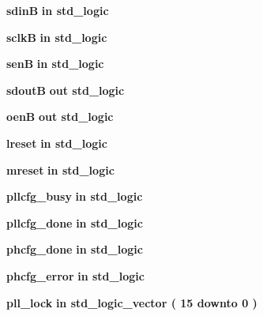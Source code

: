 \begin{DoxyCompactItemize}
{\bf sdinB}  {\bfseries {\bfseries \textcolor{keywordflow}{in}\textcolor{vhdlchar}{ }}} {\bfseries \textcolor{comment}{std\+\_\+logic}\textcolor{vhdlchar}{ }} 
\item 
{\bf sclkB}  {\bfseries {\bfseries \textcolor{keywordflow}{in}\textcolor{vhdlchar}{ }}} {\bfseries \textcolor{comment}{std\+\_\+logic}\textcolor{vhdlchar}{ }} 
\item 
{\bf senB}  {\bfseries {\bfseries \textcolor{keywordflow}{in}\textcolor{vhdlchar}{ }}} {\bfseries \textcolor{comment}{std\+\_\+logic}\textcolor{vhdlchar}{ }} 
\item 
{\bf sdoutB}  {\bfseries {\bfseries \textcolor{keywordflow}{out}\textcolor{vhdlchar}{ }}} {\bfseries \textcolor{comment}{std\+\_\+logic}\textcolor{vhdlchar}{ }} 
\item 
{\bf oenB}  {\bfseries {\bfseries \textcolor{keywordflow}{out}\textcolor{vhdlchar}{ }}} {\bfseries \textcolor{comment}{std\+\_\+logic}\textcolor{vhdlchar}{ }} 
\item 
{\bf lreset}  {\bfseries {\bfseries \textcolor{keywordflow}{in}\textcolor{vhdlchar}{ }}} {\bfseries \textcolor{comment}{std\+\_\+logic}\textcolor{vhdlchar}{ }} 
\item 
{\bf mreset}  {\bfseries {\bfseries \textcolor{keywordflow}{in}\textcolor{vhdlchar}{ }}} {\bfseries \textcolor{comment}{std\+\_\+logic}\textcolor{vhdlchar}{ }} 
\item 
{\bf pllcfg\+\_\+busy}  {\bfseries {\bfseries \textcolor{keywordflow}{in}\textcolor{vhdlchar}{ }}} {\bfseries \textcolor{comment}{std\+\_\+logic}\textcolor{vhdlchar}{ }} 
\item 
{\bf pllcfg\+\_\+done}  {\bfseries {\bfseries \textcolor{keywordflow}{in}\textcolor{vhdlchar}{ }}} {\bfseries \textcolor{comment}{std\+\_\+logic}\textcolor{vhdlchar}{ }} 
\item 
{\bf phcfg\+\_\+done}  {\bfseries {\bfseries \textcolor{keywordflow}{in}\textcolor{vhdlchar}{ }}} {\bfseries \textcolor{comment}{std\+\_\+logic}\textcolor{vhdlchar}{ }} 
\item 
{\bf phcfg\+\_\+error}  {\bfseries {\bfseries \textcolor{keywordflow}{in}\textcolor{vhdlchar}{ }}} {\bfseries \textcolor{comment}{std\+\_\+logic}\textcolor{vhdlchar}{ }} 
\item 
{\bf pll\+\_\+lock}  {\bfseries {\bfseries \textcolor{keywordflow}{in}\textcolor{vhdlchar}{ }}} {\bfseries \textcolor{comment}{std\+\_\+logic\+\_\+vector}\textcolor{vhdlchar}{ }\textcolor{vhdlchar}{(}\textcolor{vhdlchar}{ }\textcolor{vhdlchar}{ } \textcolor{vhdldigit}{15} \textcolor{vhdlchar}{ }\textcolor{keywordflow}{downto}\textcolor{vhdlchar}{ }\textcolor{vhdlchar}{ } \textcolor{vhdldigit}{0} \textcolor{vhdlchar}{ }\textcolor{vhdlchar}{)}\textcolor{vhdlchar}{ }} 

\end{DoxyCompactItemize}
